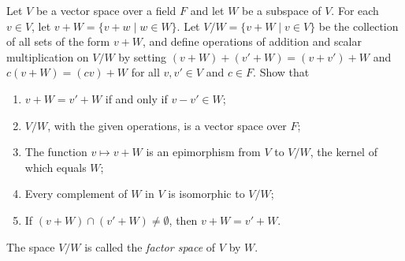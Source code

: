 \begin{problem}[Golan 307]
Let $V$ be a vector space over a field $F$ and let $W$ be a subspace of $V$.  
For each $v \in V$, let $v + W = \{v+w \mid w \in W\}$.  Let 
$V/W = \{v+W \mid v \in V\}$ be the collection of all sets of the form $v+W$,
and define operations of addition and scalar multiplication on $V/W$ by 
setting $(v+W) + (v'+W) = (v+v')+W$ and $c(v+W) = (cv)+W$ for all $v, v' \in V$
and $c\in F$.  Show that
\begin{enumerate}
\item $v+W = v'+W$ if and only if $v-v'\in W$;
\item $V/W$, with the given operations, is a vector space over $F$;
\item The function $v\mapsto v+W$ is an epimorphism from $V$ to $V/W$,
the kernel of which equals $W$;
\item Every complement of $W$ in $V$ is isomorphic to $V/W$;
\item If $(v+W)\cap (v'+W) \neq \emptyset$, then $v+W = v'+W$.
\end{enumerate}
The space $V/W$ is called the \emph{factor space} of $V$ by $W$.
\end{problem}

